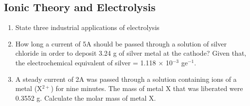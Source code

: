 \subsection{Ionic Theory and Electrolysis}

\begin{enumerate}
	\item State three industrial applications of electrolysis
	
	\item How long a current of 5A should be passed through a solution of silver chloride in order to deposit 3.24 g of silver metal at the cathode? Given that, the electrochemical equivalent of silver = 1.118 $\times$ 10$^{-3}$ ge$^{-1}$. 
	
	\item A steady current of 2A was passed through a solution containing ions of a metal (X$^{2+}$) for nine minutes. The mass of metal X that was liberated were 0.3552 g. Calculate the molar mass of metal X. 
	
\end{enumerate}









